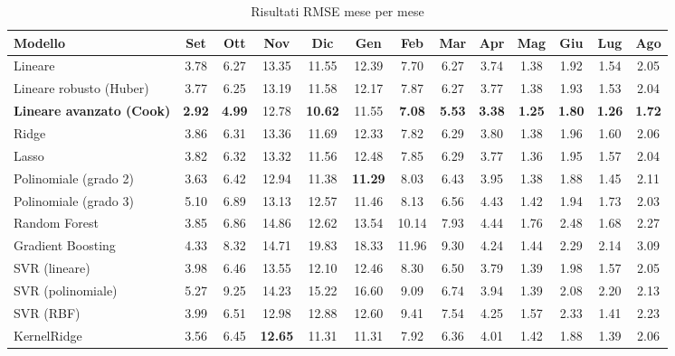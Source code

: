 \begin{table}[H]
    \tiny
    \centering
    \setlength{\tabcolsep}{4pt}
    \def\arraystretch{1.5}
    \begin{tabular}{|l|c|c|c|c|c|c|c|c|c|c|c|c|}
    \hline
        \textbf{Modello} & \textbf{Set} & \textbf{Ott} & \textbf{Nov} & \textbf{Dic} & \textbf{Gen} & \textbf{Feb} & \textbf{Mar} & \textbf{Apr} & \textbf{Mag} & \textbf{Giu} & \textbf{Lug} & \textbf{Ago} \\ \hline
        Lineare & 3.78 & 6.27 & 13.35 & 11.55 & 12.39 & 7.70 & 6.27 & 3.74 & 1.38 & 1.92 & 1.54 & 2.05 \\ \hline
        Lineare robusto (Huber) & 3.77 & 6.25 & 13.19 & 11.58 & 12.17 & 7.87 & 6.27 & 3.77 & 1.38 & 1.93 & 1.53 & 2.04 \\ \hline
        \textbf{Lineare avanzato (Cook)} & \textbf{2.92} & \textbf{4.99} & 12.78 & \textbf{10.62} & 11.55 & \textbf{7.08} & \textbf{5.53} & \textbf{3.38} & \textbf{1.25} & \textbf{1.80} & \textbf{1.26} & \textbf{1.72} \\ \hline
        Ridge & 3.86 & 6.31 & 13.36 & 11.69 & 12.33 & 7.82 & 6.29 & 3.80 & 1.38 & 1.96 & 1.60 & 2.06 \\ \hline
        Lasso & 3.82 & 6.32 & 13.32 & 11.56 & 12.48 & 7.85 & 6.29 & 3.77 & 1.36 & 1.95 & 1.57 & 2.04 \\ \hline
        Polinomiale (grado 2) & 3.63 & 6.42 & 12.94 & 11.38 & \textbf{11.29} & 8.03 & 6.43 & 3.95 & 1.38 & 1.88 & 1.45 & 2.11 \\ \hline
        Polinomiale (grado 3) & 5.10 & 6.89 & 13.13 & 12.57 & 11.46 & 8.13 & 6.56 & 4.43 & 1.42 & 1.94 & 1.73 & 2.03 \\ \hline
        Random Forest & 3.85 & 6.86 & 14.86 & 12.62 & 13.54 & 10.14 & 7.93 & 4.44 & 1.76 & 2.48 & 1.68 & 2.27 \\ \hline
        Gradient Boosting & 4.33 & 8.32 & 14.71 & 19.83 & 18.33 & 11.96 & 9.30 & 4.24 & 1.44 & 2.29 & 2.14 & 3.09 \\ \hline
        SVR (lineare) & 3.98 & 6.46 & 13.55 & 12.10 & 12.46 & 8.30 & 6.50 & 3.79 & 1.39 & 1.98 & 1.57 & 2.05 \\ \hline
        SVR (polinomiale) & 5.27 & 9.25 & 14.23 & 15.22 & 16.60 & 9.09 & 6.74 & 3.94 & 1.39 & 2.08 & 2.20 & 2.13 \\ \hline
        SVR (RBF) & 3.99 & 6.51 & 12.98 & 12.88 & 12.60 & 9.41 & 7.54 & 4.25 & 1.57 & 2.33 & 1.41 & 2.23 \\ \hline
        KernelRidge & 3.56 & 6.45 & \textbf{12.65} & 11.31 & 11.31 & 7.92 & 6.36 & 4.01 & 1.42 & 1.88 & 1.39 & 2.06 \\ \hline
    \end{tabular}
    \caption{Risultati RMSE mese per mese}
    \label{fig:risultati-pm2.5-rmse-mese}
\end{table}

